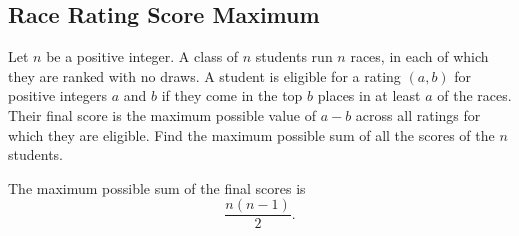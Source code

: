 
\subsection{Race Rating Score Maximum}

\begin{problemstatement}
Let \(n\) be a positive integer. A class of \(n\) students run \(n\) races, in
each of which they are ranked with no draws. A student is eligible for a rating
\((a, b)\) for positive integers \(a\) and \(b\) if they come in the top \(b\)
places in at least \(a\) of the races. Their final score is the maximum possible
value of \(a-b\) across all ratings for which they are eligible. Find the
maximum possible sum of all the scores of the \(n\) students.
\end{problemstatement}

\begin{theorem}
The maximum possible sum of the final scores is
\[
  \frac{n(n-1)}{2}.
\]
\end{theorem}

